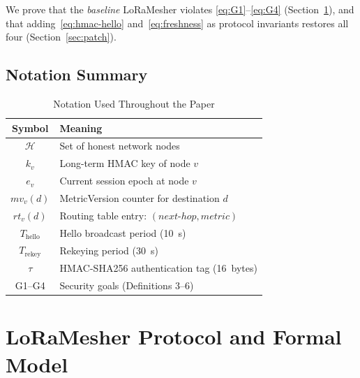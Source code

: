 \documentclass[preprint,12pt]{elsarticle}
\begin{document}
We prove that the \emph{baseline} LoRaMesher violates
\eqref{eq:G1}--\eqref{eq:G4} (Section~\ref{sec:formal}),
and that adding~\eqref{eq:hmac-hello} and~\eqref{eq:freshness}
as protocol invariants restores all four (Section~\ref{sec:patch}).

\subsection{Notation Summary}

\begin{table}[h]
  \centering
  \caption{Notation Used Throughout the Paper}
  \label{tab:notation}
  \setlength{\tabcolsep}{4pt}
  \begin{tabular}{cl}
    \toprule
    \textbf{Symbol} & \textbf{Meaning} \\
    \midrule
    $\mathcal{H}$   & Set of honest network nodes \\
    $k_v$           & Long-term HMAC key of node $v$ \\
    $e_v$           & Current session epoch at node $v$ \\
    $mv_v(d)$       & MetricVersion counter for destination $d$ \\
    $rt_v(d)$       & Routing table entry: $(next\text{-}hop, metric)$ \\
    $T_{\text{hello}}$ & Hello broadcast period (10~s) \\
    $T_{\text{rekey}}$ & Rekeying period (30~s) \\
    $\tau$          & HMAC-SHA256 authentication tag (16~bytes) \\
    G1--G4          & Security goals (Definitions 3--6) \\
    \bottomrule
  \end{tabular}
\end{table}

\section{LoRaMesher Protocol and Formal Model}
\label{sec:formal}
\end{document}
